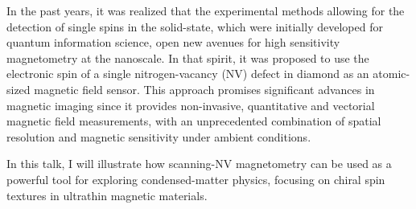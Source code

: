 In the past years, it was realized that the experimental methods allowing for the detection of single spins in the solid-state, which were initially developed for quantum information science, open new avenues for high sensitivity magnetometry at the nanoscale. In that spirit, it was proposed to use the electronic spin of a single nitrogen-vacancy (NV) defect in diamond as an atomic-sized magnetic field sensor. This approach promises significant advances in magnetic imaging since it provides non-invasive, quantitative and vectorial magnetic field measurements, with an unprecedented combination of spatial resolution and magnetic sensitivity under ambient conditions.

In this talk, I will illustrate how scanning-NV magnetometry can be used as a powerful tool for exploring condensed-matter physics, focusing on chiral spin textures in ultrathin magnetic materials.